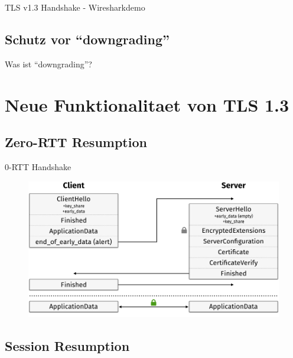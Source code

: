 \documentclass{f4_beamer_metropolis}
\begin{document}
\begin{frame}[standout]
  TLS v1.3 Handshake - Wiresharkdemo
\end{frame}

\subsection{Schutz vor \enquote{downgrading}}

\begin{frame}{Was ist \enquote{downgrading}?}

\end{frame}

\section{Neue Funktionalitaet von TLS 1.3}

\subsection{Zero-RTT Resumption}

\begin{frame}{0-RTT Handshake}
  \begin{figure}[!h]
    \centering
    \vspace*{-0.25cm}
    \includegraphics[width=\linewidth]{./images/tls13-handshake-zero-rtt.png}
    \label{fig:tls13-handshake-zero-rtt}
  \end{figure}
\end{frame}

\subsection{Session Resumption}
\end{document}
